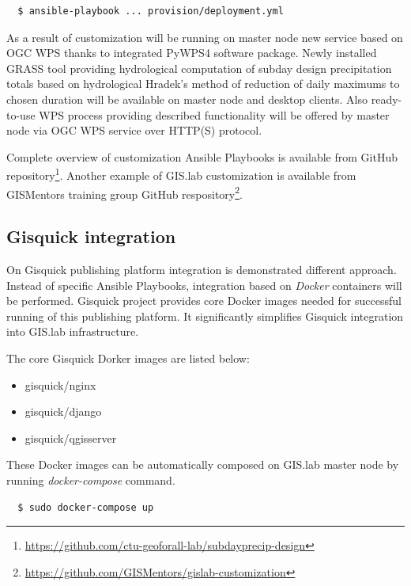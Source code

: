 \documentclass{isprs}
\begin{document}
\begin{lstlisting}
  $ ansible-playbook ... provision/deployment.yml
\end{lstlisting}

As a result of customization will be running on master node new
service based on OGC WPS thanks to integrated PyWPS4 software
package. Newly installed GRASS tool providing hydrological computation
of subday design precipitation totals based on hydrological Hradek's
method of reduction of daily maximums to chosen duration will be
available on master node and desktop clients. Also ready-to-use WPS
process providing described functionality will be offered by master
node via OGC WPS service over HTTP(S) protocol.

Complete overview of customization Ansible Playbooks is available from
GitHub
repository\footnote{\url{https://github.com/ctu-geoforall-lab/subdayprecip-design}}. Another
example of GIS.lab customization is available from GISMentors training
group GitHub
respository\footnote{\url{https://github.com/GISMentors/gislab-customization}}.

\subsection{Gisquick integration}

On Gisquick publishing platform integration is demonstrated
different approach. Instead of specific Ansible Playbooks, integration
based on \textit{Docker} containers will be performed. Gisquick
project provides core Docker images needed for successful running of
this publishing platform. It significantly simplifies Gisquick
integration into GIS.lab infrastructure.

The core Gisquick Dorker images are listed below:

\begin{itemize}
\setlength\itemsep{0em}\setlength\parskip{0em}\setlength\topsep{0em}\setlength\partopsep{0em}\setlength\parsep{0em}
\item{gisquick/nginx}
\item{gisquick/django}
\item{gisquick/qgisserver}
\end{itemize}

These Docker images can be automatically composed on GIS.lab master
node by running \textit{docker-compose} command.

\begin{lstlisting}
  $ sudo docker-compose up
\end{lstlisting}
\end{document}
